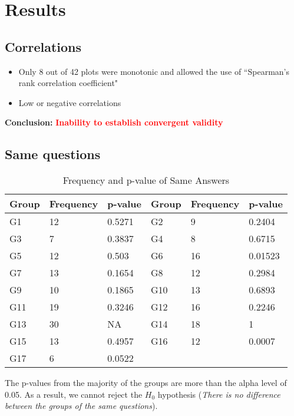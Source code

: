 \section{Results}

\subsection*{Correlations}

\begin{itemize}
	\item Only 8 out of 42 plots were monotonic and allowed the use of  ``Spearman's rank correlation coefficient"
	\item Low or negative correlations
\end{itemize}

\textbf{Conclusion:} \textcolor{red}{\textbf{Inability to establish convergent validity}}

\clearpage

\subsection*{Same questions} 

\begin{table} [H]
	\begin{tabular}{| p{1cm} | p{1.5cm} | p{1.5cm} | p{2cm} | p{1.5cm} | p{1.5cm} |} \hline
		Group & Frequency & p-value & Group & Frequency & p-value \\ \hline
		G1 & 12 & 0.5271 & G2 & 9 & 0.2404 \\ \hline
		G3 & 7 & 0.3837 & G4 & 8 & 0.6715 \\ \hline
		G5 & 12 & 0.503 & G6 & 16 & 0.01523 \\ \hline
		G7 & 13 & 0.1654 & G8 & 12 & 0.2984 \\ \hline
		G9 & 10 & 0.1865 & G10 & 13 & 0.6893 \\ \hline
		G11 & 19 & 0.3246 & G12 & 16 & 0.2246 \\ \hline
		G13 & 30 & NA & G14 & 18 & 1 \\ \hline
		G15 & 13 & 0.4957 & G16 & 12 & 0.0007 \\ \hline
		G17 & 6 & 0.0522 & & & \\ \hline
	\end{tabular}
	\caption{Frequency and p-value of Same Answers}
	\label{table:answers_frequency}
\end{table}

The p-values from the majority of the groups are more than the alpha level of 0.05. As a result, we cannot reject the $H_0$ hypothesis ({\scriptsize \textit{There is no difference between the groups of the same questions}}).

